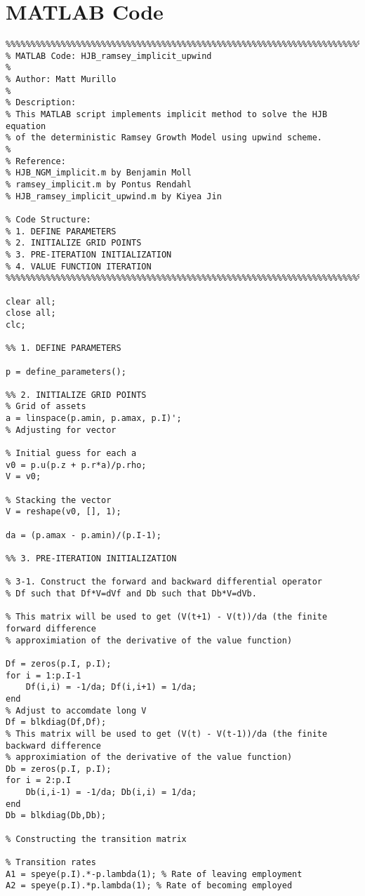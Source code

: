 \section*{MATLAB Code}
\begin{lstlisting}
%%%%%%%%%%%%%%%%%%%%%%%%%%%%%%%%%%%%%%%%%%%%%%%%%%%%%%%%%%%%%%%%%%%%%%%%%
% MATLAB Code: HJB_ramsey_implicit_upwind
% 
% Author: Matt Murillo
%
% Description:
% This MATLAB script implements implicit method to solve the HJB equation
% of the deterministic Ramsey Growth Model using upwind scheme.
%
% Reference:
% HJB_NGM_implicit.m by Benjamin Moll
% ramsey_implicit.m by Pontus Rendahl
% HJB_ramsey_implicit_upwind.m by Kiyea Jin

% Code Structure:
% 1. DEFINE PARAMETERS
% 2. INITIALIZE GRID POINTS
% 3. PRE-ITERATION INITIALIZATION
% 4. VALUE FUNCTION ITERATION
%%%%%%%%%%%%%%%%%%%%%%%%%%%%%%%%%%%%%%%%%%%%%%%%%%%%%%%%%%%%%%%%%%%%%%%%%

clear all;
close all;
clc;

%% 1. DEFINE PARAMETERS

p = define_parameters();

%% 2. INITIALIZE GRID POINTS
% Grid of assets
a = linspace(p.amin, p.amax, p.I)';
% Adjusting for vector 

% Initial guess for each a
v0 = p.u(p.z + p.r*a)/p.rho;
V = v0;

% Stacking the vector
V = reshape(v0, [], 1);

da = (p.amax - p.amin)/(p.I-1);

%% 3. PRE-ITERATION INITIALIZATION

% 3-1. Construct the forward and backward differential operator 
% Df such that Df*V=dVf and Db such that Db*V=dVb. 

% This matrix will be used to get (V(t+1) - V(t))/da (the finite forward difference
% approximiation of the derivative of the value function)

Df = zeros(p.I, p.I);
for i = 1:p.I-1
    Df(i,i) = -1/da; Df(i,i+1) = 1/da;
end
% Adjust to accomdate long V
Df = blkdiag(Df,Df);
% This matrix will be used to get (V(t) - V(t-1))/da (the finite backward difference
% approximiation of the derivative of the value function)
Db = zeros(p.I, p.I);
for i = 2:p.I
    Db(i,i-1) = -1/da; Db(i,i) = 1/da;
end
Db = blkdiag(Db,Db);

% Constructing the transition matrix

% Transition rates
A1 = speye(p.I).*-p.lambda(1); % Rate of leaving employment
A2 = speye(p.I).*p.lambda(1); % Rate of becoming employed


\end{lstlisting}
